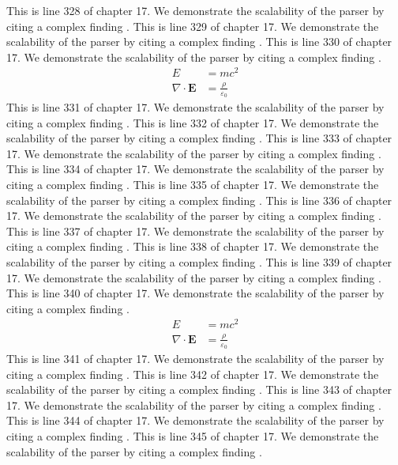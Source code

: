 This is line 328 of chapter 17. We demonstrate the scalability of the parser by citing a complex finding \cite{ref17_328}.
This is line 329 of chapter 17. We demonstrate the scalability of the parser by citing a complex finding \cite{ref17_329}.
This is line 330 of chapter 17. We demonstrate the scalability of the parser by citing a complex finding \cite{ref17_330}.
\begin{align*}
  E &= mc^2 \\
  \nabla \cdot \mathbf{E} &= \frac{\rho}{\varepsilon_0}
\end{align*}
This is line 331 of chapter 17. We demonstrate the scalability of the parser by citing a complex finding \cite{ref17_331}.
This is line 332 of chapter 17. We demonstrate the scalability of the parser by citing a complex finding \cite{ref17_332}.
This is line 333 of chapter 17. We demonstrate the scalability of the parser by citing a complex finding \cite{ref17_333}.
This is line 334 of chapter 17. We demonstrate the scalability of the parser by citing a complex finding \cite{ref17_334}.
This is line 335 of chapter 17. We demonstrate the scalability of the parser by citing a complex finding \cite{ref17_335}.
This is line 336 of chapter 17. We demonstrate the scalability of the parser by citing a complex finding \cite{ref17_336}.
This is line 337 of chapter 17. We demonstrate the scalability of the parser by citing a complex finding \cite{ref17_337}.
This is line 338 of chapter 17. We demonstrate the scalability of the parser by citing a complex finding \cite{ref17_338}.
This is line 339 of chapter 17. We demonstrate the scalability of the parser by citing a complex finding \cite{ref17_339}.
This is line 340 of chapter 17. We demonstrate the scalability of the parser by citing a complex finding \cite{ref17_340}.
\begin{align*}
  E &= mc^2 \\
  \nabla \cdot \mathbf{E} &= \frac{\rho}{\varepsilon_0}
\end{align*}
This is line 341 of chapter 17. We demonstrate the scalability of the parser by citing a complex finding \cite{ref17_341}.
This is line 342 of chapter 17. We demonstrate the scalability of the parser by citing a complex finding \cite{ref17_342}.
This is line 343 of chapter 17. We demonstrate the scalability of the parser by citing a complex finding \cite{ref17_343}.
This is line 344 of chapter 17. We demonstrate the scalability of the parser by citing a complex finding \cite{ref17_344}.
This is line 345 of chapter 17. We demonstrate the scalability of the parser by citing a complex finding \cite{ref17_345}.
